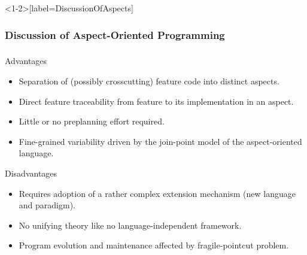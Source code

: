 \begin{frame}<1-2>[label=DiscussionOfAspects]
	\frametitle<1-2>{Discussion of Aspect-Oriented Programming}
	\frametitle<3>{\myframetitle}
	\begin{fancycolumns}
		\begin{note}{Advantages}
			\begin{itemize}
				\item Separation of (possibly crosscutting) feature code into distinct aspects.
				\item Direct feature traceability from feature to its implementation in an aspect.
				\item Little or no preplanning effort required.
				\item Fine-grained variability driven by the join-point model of the aspect-oriented language.
			\end{itemize}
		\end{note}
	\nextcolumn
		\begin{note}{Disadvantages}
			\begin{itemize}
				\item Requires adoption of a rather complex extension mechanism (new language and paradigm).
				\item No unifying theory like no language-independent framework.
				\item Program evolution and maintenance affected by fragile-pointcut problem.
			\end{itemize}
		\end{note}
	\end{fancycolumns}
\end{frame}